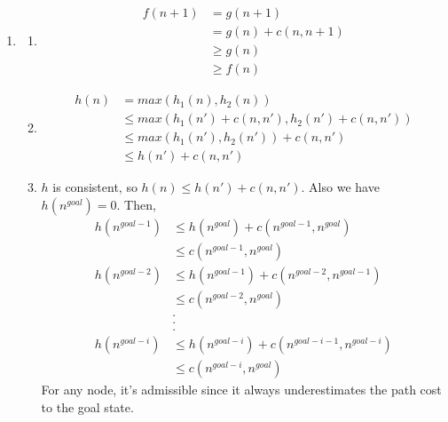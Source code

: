 \documentclass{article}
\begin{document}
\begin{enumerate}
\item

\begin{enumerate}
  \item
  \begin{equation}
  \begin{aligned}
  f(n+1) &= g(n+1) \\
         &= g(n) + c(n,n+1) \\
         &\geqslant g(n) \\
         &\geqslant f(n)  
  \end{aligned}
  \end{equation}


  \item
  \begin{equation}
  \begin{aligned}
  h(n) &= max(h_1(n),h_2(n)) \\
       &\leqslant max(h_1(n') + c(n,n'), h_2(n') + c(n,n')) \\
       &\leqslant max(h_1(n'),h_2(n')) + c(n,n') \\
       &\leqslant h(n') + c(n,n')  
  \end{aligned}
  \end{equation}

  \item
  $h$ is consistent, so $h(n) \leqslant h(n') + c(n,n')$. Also we have $h(n^{goal}) = 0$. 
  Then,
  \begin{equation}
  \begin{aligned}
  h(n^{goal-1}) &\leqslant h(n^{goal}) + c(n^{goal-1},n^{goal}) \\
                &\leqslant c(n^{goal-1},n^{goal}) \\
  h(n^{goal-2}) &\leqslant h(n^{goal-1}) + c(n^{goal-2},n^{goal-1}) \\
                &\leqslant c(n^{goal-2},n^{goal}) \\
                &. \\
                &. \\
                &. \\                  
  h(n^{goal-i}) &\leqslant h(n^{goal-i}) + c(n^{goal-i-1},n^{goal-i}) \\
                &\leqslant c(n^{goal-i},n^{goal})
  \end{aligned}
  \end{equation}
  For any node, it's admissible since it always underestimates the path cost to the goal state.


\end{enumerate}
\end{enumerate}
\end{document}
